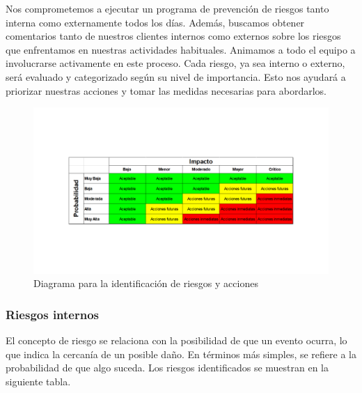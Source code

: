     Nos comprometemos a ejecutar un programa de prevención de riesgos tanto interna como externamente todos los días. Además, buscamos obtener comentarios tanto de nuestros clientes internos como externos sobre los riesgos que enfrentamos en nuestras actividades habituales. Animamos a todo el equipo a involucrarse activamente en este proceso. Cada riesgo, ya sea interno o externo, será evaluado y categorizado según su nivel de importancia. Esto nos ayudará a priorizar nuestras acciones y tomar las medidas necesarias para abordarlos.
    \begin{figure}[H]
        \centering
        \includegraphics[scale=0.17]{30/img/TablaDeRiesgo.pdf}
        \caption{Diagrama para la identificación de riesgos y acciones}
    \end{figure}
    \subsubsection{Riesgos internos}
    
    El concepto de riesgo se relaciona con la posibilidad de que un evento ocurra, lo que indica la cercanía de un posible daño. En términos más simples, se refiere a la probabilidad de que algo suceda. Los riesgos identificados se muestran en la siguiente tabla.
    
